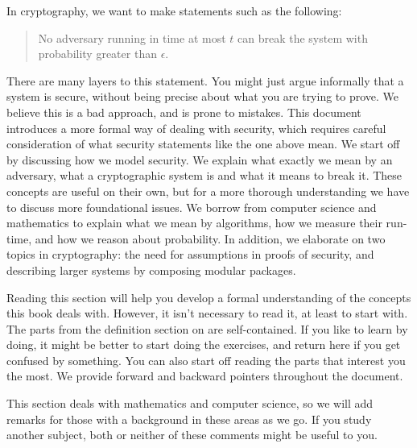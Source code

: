 In cryptography, we want to make statements such as the following:
\begin{quote}
No adversary running in time at most $t$ can break the system with probability greater than $\epsilon$.
\end{quote}

There are many layers to this statement. You might just argue informally that a system is secure, without being precise about what you are trying to prove. We believe this is a bad approach, and is prone to mistakes. This document introduces a more formal way of dealing with security, which requires careful consideration of what security statements like the one above mean. We start off by discussing how we model security. We explain what exactly we mean by an adversary, what a cryptographic system is and what it means to break it. These concepts are useful on their own, but for a more thorough understanding we have to discuss more foundational issues. We borrow from computer science and mathematics to explain what we mean by algorithms, how we measure their run-time, and how we reason about probability. In addition, we elaborate on two topics in cryptography: the need for assumptions in proofs of security, and describing larger systems by composing modular packages.

Reading this section will help you develop a formal understanding of the concepts this book deals with. However, it isn't necessary to read it, at least to start with. The parts from the definition section on are self-contained. If you like to learn by doing, it might be better to start doing the exercises, and return here if you get confused by something. You can also start off reading the parts that interest you the most. We provide forward and backward pointers throughout the document.

This section deals with mathematics and computer science, so we will add remarks for those with a background in these areas as we go. If you study another subject, both or neither of these comments might be useful to you.